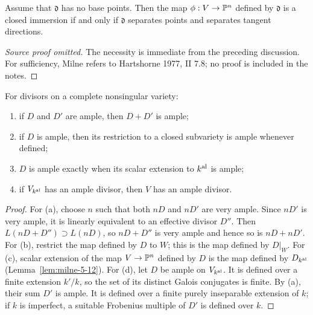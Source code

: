 \begin{proposition}
\label{prop:milne-6-3}

Assume that $\mathfrak d$ has no base points.  Then the map
$\phi:V\to\mathbb{P}^n$ defined by $\mathfrak d$ is a closed immersion if and only if
$\mathfrak d$ separates points and separates tangent directions.
\end{proposition}

\begin{proof}[Source proof omitted]
The necessity is immediate from the preceding discussion.  For sufficiency,
Milne refers to Hartshorne 1977, II 7.8; no proof is included in the notes.
\end{proof}


\begin{proposition}
\label{prop:milne-6-6}

For divisors on a complete nonsingular variety:
\begin{enumerate}
\item if $D$ and $D'$ are ample, then $D+D'$ is ample;
\item if $D$ is ample, then its restriction to a closed subvariety is ample
whenever defined;
\item $D$ is ample exactly when its scalar extension to $k^{\rm al}$ is ample;
\item if $V_{k^{\rm al}}$ has an ample divisor, then $V$ has an ample divisor.
\end{enumerate}
\end{proposition}

\begin{proof}
For (a), choose $n$ such that both $nD$ and $nD'$ are very ample.  Since
$nD'$ is very ample, it is linearly equivalent to an effective divisor $D''$.
Then $L(nD+D'')\supset L(nD)$, so $nD+D''$ is very ample and hence so is
$nD+nD'$.  For (b), restrict the map defined by $D$ to $W$; this is the map
defined by $D|_W$.  For (c), scalar extension of the map $V\to\mathbb{P}^n$ defined
by $D$ is the map defined by $D_{k^{\rm al}}$ (Lemma~\ref{lem:milne-5-12}).
For (d), let $D$ be ample on $V_{k^{\rm al}}$.  It is defined over a finite
extension $k'/k$, so the set of its distinct Galois conjugates is finite.  By
(a), their sum $D'$ is ample.  It is defined over a finite purely inseparable
extension of $k$; if $k$ is imperfect, a suitable Frobenius multiple of $D'$
is defined over $k$.
\end{proof}


